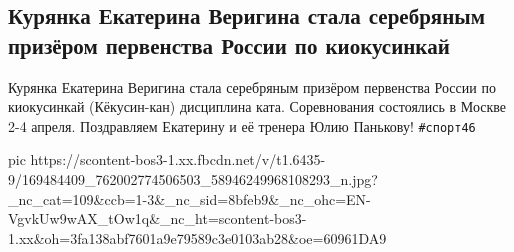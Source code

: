  
 
 
 
 

\subsection{Курянка Екатерина Веригина стала серебряным призёром первенства России по киокусинкай}
\label{sec:06_04_2021.fb.kursk2032.1.sport_verigina_ekaterina}

Курянка Екатерина Веригина стала серебряным призёром первенства России по
киокусинкай (Кёкусин-кан) дисциплина ката. Соревнования состоялись в Москве 2-4
апреля. Поздравляем Екатерину и её тренера Юлию Панькову! \verb|#спорт46|

\ifcmt
  pic https://scontent-bos3-1.xx.fbcdn.net/v/t1.6435-9/169484409_762002774506503_58946249968108293_n.jpg?_nc_cat=109&ccb=1-3&_nc_sid=8bfeb9&_nc_ohc=EN-VgvkUw9wAX_tOw1q&_nc_ht=scontent-bos3-1.xx&oh=3fa138abf7601a9e79589c3e0103ab28&oe=60961DA9
\fi

